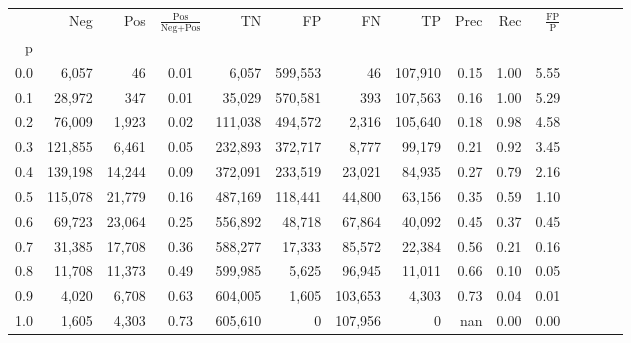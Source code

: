 \begin{tabular}{rrrcrrrrrrrrrrr}
\toprule
{} &      Neg &     Pos & $\frac{\text{Pos}}{\text{Neg}+\text{Pos}}$ &       TN &       FP &       FN &       TP &  Prec &   Rec & $\frac{\text{FP}}{\text{P}}$ \\
p   &          &         &                                            &          &          &          &          &       &       &                              \\
\midrule
0.0 &    6,057 &      46 &                                       0.01 &    6,057 &  599,553 &       46 &  107,910 &  0.15 &  1.00 &                         5.55 \\
0.1 &   28,972 &     347 &                                       0.01 &   35,029 &  570,581 &      393 &  107,563 &  0.16 &  1.00 &                         5.29 \\
0.2 &   76,009 &   1,923 &                                       0.02 &  111,038 &  494,572 &    2,316 &  105,640 &  0.18 &  0.98 &                         4.58 \\
0.3 &  121,855 &   6,461 &                                       0.05 &  232,893 &  372,717 &    8,777 &   99,179 &  0.21 &  0.92 &                         3.45 \\
0.4 &  139,198 &  14,244 &                                       0.09 &  372,091 &  233,519 &   23,021 &   84,935 &  0.27 &  0.79 &                         2.16 \\
0.5 &  115,078 &  21,779 &                                       0.16 &  487,169 &  118,441 &   44,800 &   63,156 &  0.35 &  0.59 &                         1.10 \\
0.6 &   69,723 &  23,064 &                                       0.25 &  556,892 &   48,718 &   67,864 &   40,092 &  0.45 &  0.37 &                         0.45 \\
0.7 &   31,385 &  17,708 &                                       0.36 &  588,277 &   17,333 &   85,572 &   22,384 &  0.56 &  0.21 &                         0.16 \\
0.8 &   11,708 &  11,373 &                                       0.49 &  599,985 &    5,625 &   96,945 &   11,011 &  0.66 &  0.10 &                         0.05 \\
0.9 &    4,020 &   6,708 &                                       0.63 &  604,005 &    1,605 &  103,653 &    4,303 &  0.73 &  0.04 &                         0.01 \\
1.0 &    1,605 &   4,303 &                                       0.73 &  605,610 &        0 &  107,956 &        0 &   nan &  0.00 &                         0.00 \\
\bottomrule
\end{tabular}
